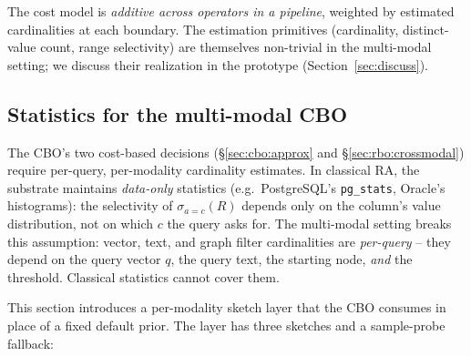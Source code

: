 \documentclass[sigconf,nonacm,review]{acmart}
\theoremstyle{plain}
\theoremstyle{definition}
\theoremstyle{remark}
\begin{document}
The cost model is \emph{additive across operators in a pipeline},
weighted by estimated cardinalities at each boundary. The estimation
primitives (cardinality, distinct-value count, range selectivity) are
themselves non-trivial in the multi-modal setting; we discuss their
realization in the prototype (Section~\ref{sec:discuss}).

\subsection{Statistics for the multi-modal CBO}\label{sec:cbo:stats}

The CBO's two cost-based decisions (\S\ref{sec:cbo:approx} and
\S\ref{sec:rbo:crossmodal}) require per-query, per-modality
cardinality estimates. In classical RA, the substrate maintains
\emph{data-only} statistics (e.g.\ PostgreSQL's
\texttt{pg\_stats}, Oracle's histograms): the selectivity of
$\sigma_{a = c}(R)$ depends only on the column's value distribution,
not on which $c$ the query asks for. The multi-modal setting
breaks this assumption: vector, text, and graph filter
cardinalities are \emph{per-query} -- they depend on the query
vector $q$, the query text, the starting node, \emph{and} the
threshold. Classical statistics cannot cover them.

This section introduces a per-modality sketch layer that the CBO
consumes in place of a fixed default prior. The layer has three
sketches and a sample-probe fallback:
\end{document}
